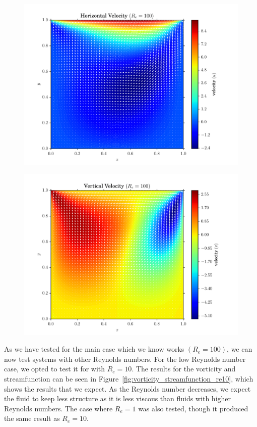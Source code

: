 \documentclass[addpoints]{exam}
\begin{document}
\begin{questions}
\begin{solution}
\begin{figure}[H]
\centering
\begin{minipage}{.45\textwidth}
\centering
\includegraphics[width=\textwidth]{figs/x-velocity_100.pdf}
\label{fig:x_vel_re100}
\end{minipage}
\begin{minipage}{.45\textwidth}
\centering
\includegraphics[width=\textwidth]{figs/y-velocity_100.pdf}
\label{fig:y_vel_re100}
\end{minipage}
\end{figure}


As we have tested for the main case which we know works $(R_{e}=100)$, we can now test systems with other Reynolds numbers. For the low Reynolds number case, we opted to test it for with $R_{e}=10$. The results for the vorticity and streamfunction can be seen in Figure~\ref{fig:vorticity_streamfunction_re10}, which shows the results that we expect. As the Reynolds number decreases, we expect the fluid to keep less structure as it is less viscous than fluids with higher Reynolds numbers. The case where $R_{e}=1$ was also tested, though it produced the same result as $R_{e}=10$. 


\end{solution}
\end{questions}
\end{document}

